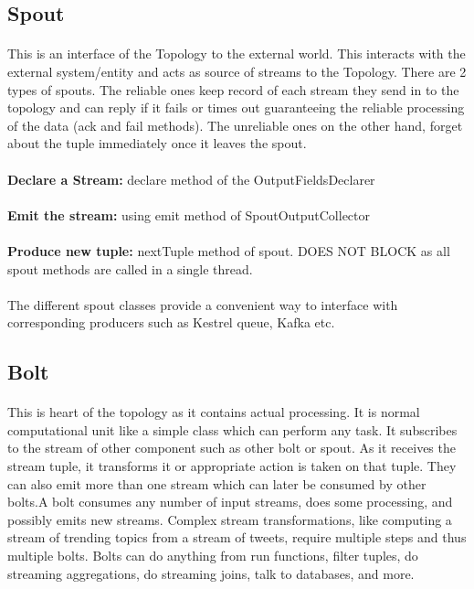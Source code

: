 \documentclass{article}
\begin{document}
    \subsection{Spout}
    \paragraph{}
    This is an interface of the Topology to the external world. This interacts
    with the external system/entity and acts as source of streams to the
    Topology. There are 2 types of spouts. The reliable ones keep record of each
    stream they send in to the topology and can reply if it fails or times out
    guaranteeing the reliable processing of the data (ack and fail methods). The
    unreliable ones on the other hand, forget about the tuple immediately once
    it leaves the spout.
    \paragraph{}
    \textbf{Declare a Stream:} declare method of the \textsf{OutputFieldsDeclarer}
    \paragraph{}
    \textbf{Emit the stream:} using emit method of \textsf{SpoutOutputCollector} 
    \paragraph{}
    \textbf{Produce new tuple:} \textsf{nextTuple} method of spout. DOES NOT BLOCK as all spout 
    methods are called in a single thread.

    \paragraph{}
     The different spout classes provide a convenient way to interface with
     corresponding producers such as Kestrel queue, Kafka etc.

    \subsection{Bolt}
    \paragraph{}
    This is heart of the topology as it contains actual processing. It is normal
    computational unit like a simple class which can perform any task. It
    subscribes to the stream of other component such as other bolt or spout. As
    it receives the stream tuple, it transforms it or appropriate action is
    taken on that tuple. They can also emit more than one stream which can later
    be consumed by other bolts.A bolt consumes any number of input streams, does
    some processing, and possibly emits new streams. Complex stream
    transformations, like computing a stream of trending topics from a stream of
    tweets, require multiple steps and thus multiple bolts. Bolts can do
    anything from run functions, filter tuples, do streaming aggregations, do
    streaming joins, talk to databases, and more. 
\end{document}
